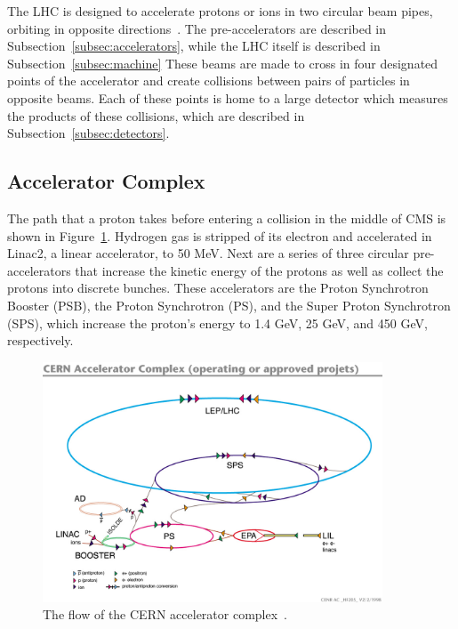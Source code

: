 The LHC is designed to accelerate protons or ions in two circular beam pipes, orbiting in opposite directions~\cite{cern-accelerators}. The pre-accelerators are described in Subsection~\ref{subsec:accelerators}, while the LHC
itself is described in Subsection~\ref{subsec:machine}
These beams are made to cross in four designated points of the accelerator and create collisions between
pairs of particles in opposite beams.
Each of these points is home to a large detector which measures the
products of these collisions, which are described in Subsection~\ref{subsec:detectors}.

\subsection{Accelerator Complex\label{subsec:accelerators}}

The path that a proton takes before entering a collision in the middle of CMS is shown in
Figure~\ref{fig:cern_accelerators}. Hydrogen gas is stripped of its electron and accelerated in
Linac2, a linear accelerator, to 50 MeV. Next are a series of three circular pre-accelerators that
increase the kinetic energy of the protons as well as collect the protons into discrete bunches.
These accelerators are the Proton Synchrotron Booster (PSB), the Proton Synchrotron (PS), and the
Super Proton Synchrotron (SPS), which increase the proton's energy to 1.4 GeV, 25 GeV, and 450 GeV,
respectively. 

\begin{figure}[ht]
 \begin{center}
    \includegraphics[width=0.90\textwidth]{figures/experiment/lhc-pho-1991-001.jpg}
      \end{center}
\caption{The flow of the CERN accelerator complex~\cite{Jean-Luc:841493}.}
\label{fig:cern_accelerators}
\end{figure}

